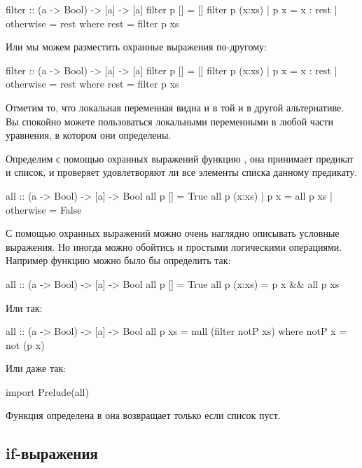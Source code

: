 \begin{code}
filter :: (a -> Bool) -> [a] -> [a]
filter  p  []       = []
filter  p  (x:xs)   
    | p x           = x : rest
    | otherwise     = rest
    where rest = filter p xs
\end{code}

Или мы можем разместить охранные выражения по-другому:


\begin{code}
filter :: (a -> Bool) -> [a] -> [a]
filter  p  []                   = []
filter  p  (x:xs)   | p x       = x : rest
                    | otherwise = rest
    where rest = filter p xs
\end{code}

Отметим то, что локальная переменная  видна и в той и в другой
альтернативе. Вы спокойно можете пользоваться локальными переменными в
любой части уравнения, в котором они определены.

Определим с помощью охранных выражений функцию , она принимает
предикат и список, и проверяет удовлетворяют ли все элементы списка
данному предикату.


\begin{code}
all :: (a -> Bool) -> [a] -> Bool
all p []        = True
all p (x:xs)    
    | p x       = all p xs
    | otherwise = False
\end{code}

С помощью охранных выражений можно очень наглядно описывать условные
выражения. Но иногда можно обойтись и простыми логическими операциями.
Например функцию  можно было бы определить так:


\begin{code}
all :: (a -> Bool) -> [a] -> Bool
all  p  []        = True
all  p  (x:xs)    = p x && all p xs
\end{code}

Или так:


\begin{code}
all :: (a -> Bool) -> [a] -> Bool
all  p  xs = null (filter notP xs)
    where notP x = not (p x)
\end{code}

Или даже так:


\begin{code}
import Prelude(all)
\end{code}

Функция  определена в  она возвращает 
только если список пуст.

\subsection{if-выражения}

